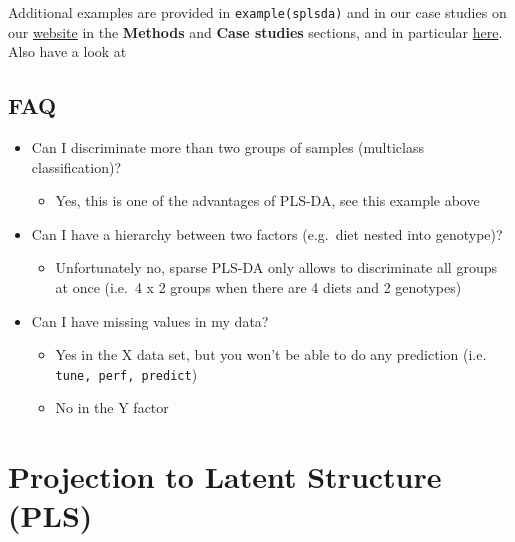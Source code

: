 \documentclass[]{book}
\providecommand{\tightlist}{%
  \setlength{\itemsep}{0pt}\setlength{\parskip}{0pt}}
\begin{document}
Additional examples are provided in \texttt{example(splsda)} and in our case studies on our \href{http://www.mixomics.org}{website} in the \textbf{Methods} and \textbf{Case studies} sections, and in particular \href{http://mixomics.org/case-studies/splsda-srbct/}{here}. Also have a look at \citep{Lec11}

\hypertarget{faq-1}{%
\section{FAQ}\label{faq-1}}

\begin{itemize}
\tightlist
\item
  Can I discriminate more than two groups of samples (multiclass classification)?

  \begin{itemize}
  \tightlist
  \item
    Yes, this is one of the advantages of PLS-DA, see this example above
  \end{itemize}
\item
  Can I have a hierarchy between two factors (e.g.~diet nested into genotype)?

  \begin{itemize}
  \tightlist
  \item
    Unfortunately no, sparse PLS-DA only allows to discriminate all groups at once (i.e.~4 x 2 groups when there are 4 diets and 2 genotypes)
  \end{itemize}
\item
  Can I have missing values in my data?

  \begin{itemize}
  \tightlist
  \item
    Yes in the X data set, but you won't be able to do any prediction (i.e. \texttt{tune,\ perf,\ predict})
  \item
    No in the Y factor
  \end{itemize}
\end{itemize}

\hypertarget{pls}{%
\chapter{Projection to Latent Structure (PLS)}\label{pls}}
\end{document}
